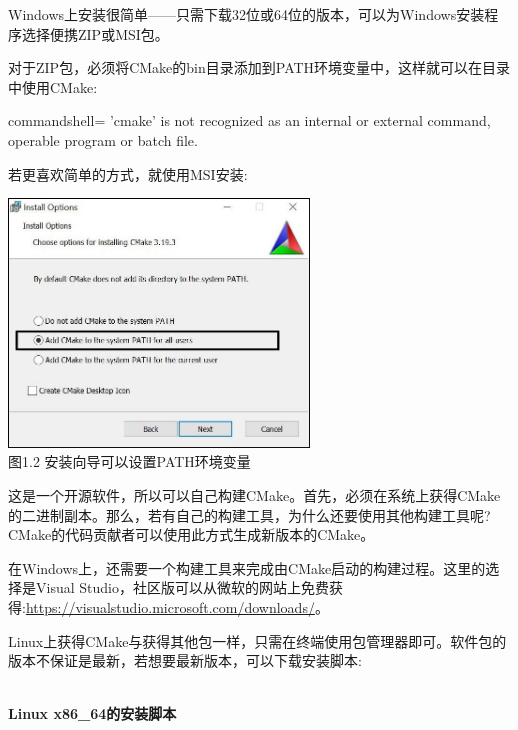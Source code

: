 
Windows上安装很简单——只需下载32位或64位的版本，可以为Windows安装程序选择便携ZIP或MSI包。

对于ZIP包，必须将CMake的bin目录添加到PATH环境变量中，这样就可以在目录中使用CMake:

\begin{tcblisting}{commandshell={}}
'cmake' is not recognized as an internal or external command,
operable program or batch file.
\end{tcblisting}

若更喜欢简单的方式，就使用MSI安装:

\begin{center}
\includegraphics[width=0.6\textwidth]{content/1/chapter1/images/2.jpg}\\
图1.2 安装向导可以设置PATH环境变量
\end{center}

这是一个开源软件，所以可以自己构建CMake。首先，必须在系统上获得CMake的二进制副本。那么，若有自己的构建工具，为什么还要使用其他构建工具呢?CMake的代码贡献者可以使用此方式生成新版本的CMake。

在Windows上，还需要一个构建工具来完成由CMake启动的构建过程。这里的选择是Visual Studio，社区版可以从微软的网站上免费获得:\url{https://visualstudio.microsoft.com/downloads/}。


Linux上获得CMake与获得其他包一样，只需在终端使用包管理器即可。软件包的版本不保证是最新，若想要最新版本，可以下载安装脚本:

\hspace*{\fill} \\ %
\noindent
\textbf{Linux x86\_64的安装脚本}


